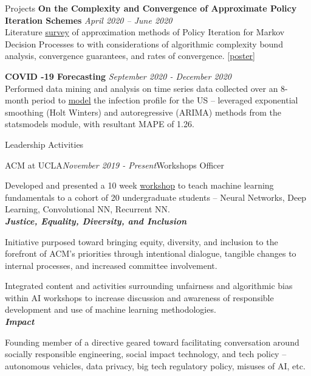 \documentclass{resume}
\begin{document}
\begin{rSection}{Projects}
{\bf On the Complexity and Convergence of Approximate Policy Iteration Schemes} \hfill {\em April 2020 – June 2020}
\\Literature \href{https://github.com/joostinyi/ECE239AS/blob/master/RL_S20.pdf}{survey} of approximation methods of Policy Iteration
for Markov Decision Processes to with considerations of algorithmic complexity bound analysis, convergence guarantees, and rates of convergence. 
[\href{https://github.com/joostinyi/ECE239AS/blob/master/Approximate-Policy-Iteration-Poster.pdf}{poster}]

{\bf COVID -19 Forecasting} \hfill {\em September 2020 - December 2020}
\\Performed data mining and analysis on time series data collected over an 8-month period to \href{https://github.com/yashlala/cs-145-project}{model} the infection profile
for the US – leveraged exponential smoothing (Holt Winters) and autoregressive (ARIMA) methods from the statsmodels module, with resultant MAPE of 1.26.

\end{rSection}

\begin{rSection}{Leadership Activities}
    \begin{rSubsection}{ACM at UCLA}{\em November 2019 - Present}{Workshops Officer}{}
        \item Developed and presented a 10 week \href{https://www.youtube.com/playlist?list=PLPO7_kXilXFYGa-3ZpOXa7Z01ZYAtUh1U}{workshop}
        to teach machine learning fundamentals to a cohort of 20 undergraduate students – Neural Networks, Deep Learning, Convolutional NN, Recurrent NN.\\
        {\textbf{\em Justice, Equality, Diversity, and Inclusion}}
        \item Initiative purposed toward bringing equity, diversity, and inclusion to the forefront of ACM’s priorities through intentional dialogue,
        tangible changes to internal processes, and increased committee involvement.
        \item Integrated content and activities surrounding unfairness and algorithmic bias within AI workshops to increase discussion and awareness
        of responsible development and use of machine learning methodologies.\\
        {\textbf{\em Impact}}
        \item Founding member of a directive geared toward facilitating conversation around socially responsible engineering, social impact technology, and tech policy
        – autonomous vehicles, data privacy, big tech regulatory policy, misuses of AI, etc.\\
    \end{rSubsection}
\end{rSection}
\end{document}
